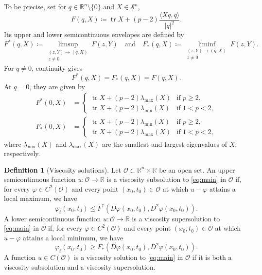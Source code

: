 \documentclass[a4paper,11pt]{amsart}
\theoremstyle{plain}
\theoremstyle{definition}
\newtheorem{definition}[theorem]{Definition}
\numberwithin{equation}{section}
\begin{document}
To be precise, set for $q\in\mathbb{R}^n\setminus\{0\}$ and $X\in\mathcal{S}^n$,
\begin{equation*}
 F(q,X)\coloneqq\operatorname{tr} X+(p-2)\frac{\langle Xq,q\rangle}{|q|^2}.
\end{equation*}
Its upper and lower semicontinuous envelopes are defined by
\begin{equation*}
 F^*(q,X)\coloneqq
 \limsup_{\substack{(z,Y)\to(q,X)\\z\ne0}}F(z,Y)
 \quad \text{and} \quad
 F_*(q,X)\coloneqq
 \liminf_{\substack{(z,Y)\to(q,X)\\z\ne0}}F(z,Y).
\end{equation*}
For $q\ne0$, continuity gives 
\begin{equation*}
    F^*(q,X)=F_*(q,X)=F(q,X).     
\end{equation*}
At $q=0$, they are given by
\begin{equation*}
 \begin{aligned}
 F^*(0,X)&=
 \begin{cases}
  \operatorname{tr} X+(p-2)\lambda_{\max}(X) &  \text{if $p\geq2$},\\
  \operatorname{tr} X+(p-2)\lambda_{\min}(X)& \text{if $1<p<2$},
 \end{cases}\\
 F_*(0,X)&=
 \begin{cases}
  \operatorname{tr} X+(p-2)\lambda_{\min}(X)&\text{if $p\geq2$},\\
  \operatorname{tr} X+(p-2)\lambda_{\max}(X)&\text{if $1<p<2$},
 \end{cases}
 \end{aligned}
\end{equation*}
where $\lambda_{\min}(X)$ and $\lambda_{\max}(X)$ are the smallest and largest eigenvalues of $X$, respectively.

\begin{definition}[Viscosity solutions]
Let $\mathcal O\subset\mathbb R^n\times\mathbb R$ be an open set. An upper semicontinuous function $u:\mathcal O\to\mathbb R$ is a viscosity subsolution to \eqref{eq:main} in $\mathcal O$ if, for every $\varphi\in C^2(\mathcal O)$ and every point
$(x_0,t_0)\in\mathcal O$ at which $u-\varphi$ attains a local maximum, we have
\begin{equation*}
\varphi_t(x_0,t_0) \leq F^*(D\varphi(x_0,t_0),D^2\varphi(x_0,t_0)).
\end{equation*}
A lower semicontinuous function $u:\mathcal O\to\mathbb R$ is a viscosity supersolution to \eqref{eq:main} in $\mathcal O$ if, for every $\varphi\in C^2(\mathcal O)$ and every point
$(x_0,t_0)\in\mathcal O$ at which $u-\varphi$ attains a local minimum, we have
\begin{equation*}
\varphi_t(x_0,t_0) \geq F_*(D\varphi(x_0,t_0),D^2\varphi(x_0,t_0)).
\end{equation*}
A function $u\in C(\mathcal O)$ is a viscosity solution to \eqref{eq:main} in $\mathcal O$ if it is both a viscosity subsolution and a viscosity supersolution.
\end{definition}
\end{document}
